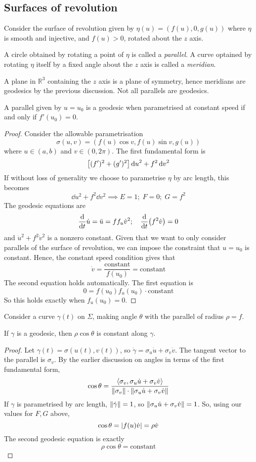 \subsection{Surfaces of revolution}
Consider the surface of revolution given by \( \eta(u) = (f(u), 0, g(u)) \) where \( \eta \) is smooth and injective, and \( f(u) > 0 \), rotated about the \( z \) axis.
\begin{definition}
	A circle obtained by rotating a point of \( \eta \) is called a \textit{parallel}.
	A curve optained by rotating \( \eta \) itself by a fixed angle about the \( z \) axis is called a \textit{meridian}.
\end{definition}
A plane in \( \mathbb R^3 \) containing the \( z \) axis is a plane of symmetry, hence meridians are geodesics by the previous discussion.
Not all parallels are geodesics.
\begin{lemma}
	A parallel given by \( u = u_0 \) is a geodesic when parametrised at constant speed if and only if \( f'(u_0) = 0 \).
\end{lemma}
\begin{proof}
	Consider the allowable parametrisation
	\[ \sigma(u,v) = (f(u) \cos v, f(u) \sin v, g(u)) \]
	where \( u \in (a,b) \) and \( v \in (0,2\pi) \).
	The first fundamental form is
	\[ \qty[ (f')^2 + (g')^2 ] \dd{u}^2 + f^2 \dd{v}^2 \]
	If without loss of generality we choose to parametrise \( \eta \) by arc length, this becomes
	\[ \dd{u}^2 + f^2 \dd{v}^2 \implies E = 1;\;F = 0;\;G = f^2 \]
	The geodesic equations are
	\[ \dv{t} \dot u = \ddot u = f f_u \dot v^2;\quad \dv{t} \qty(f^2 \dot v) = 0 \]
	and \( \dot u^2 + f^2 \dot v^2 \) is a nonzero constant.
	Given that we want to only consider parallels of the surface of revolution, we can impose the constraint that \( u = u_0 \) is constant.
	Hence, the constant speed condition gives that
	\[ \dot v = \frac{\text{constant}}{f(u_0)} = \text{constant} \]
	The second equation holds automatically.
	The first equation is
	\[ 0 = f(u_0) f_u(u_0) \cdot \text{constant} \]
	So this holds exactly when \( f_u(u_0) = 0 \).
\end{proof}
Consider a curve \( \gamma(t) \) on \( \Sigma \), making angle \( \theta \) with the parallel of radius \( \rho = f \).
\begin{proposition}
	If \( \gamma \) is a geodesic, then \( \rho \cos \theta \) is constant along \( \gamma \).
\end{proposition}
\begin{proof}
	Let \( \gamma(t) = \sigma(u(t),v(t)) \), so \( \dot\gamma = \sigma_u \dot u + \sigma_v \dot v \).
	The tangent vector to the parallel is \( \sigma_v \).
	By the earlier discussion on angles in terms of the first fundamental form,
	\[ \cos \theta = \frac{\left\langle{\sigma_v, \sigma_u \dot u + \sigma_v \dot v}\right\rangle}{\norm{\sigma_v} \cdot \norm{\sigma_u \dot u + \sigma_v \dot v}} \]
	If \( \gamma \) is parametrised by arc length, \( \norm{\dot \gamma} = 1 \), so \( \norm{\sigma_u \dot u + \sigma_v \dot v} = 1 \).
	So, using our values for \( F, G \) above,
	\[ \cos \theta = \abs{f(u) \dot v} = \rho \dot v \]
	The second geodesic equation is exactly
	\[ \rho \cos \theta = \text{constant} \]
\end{proof}
